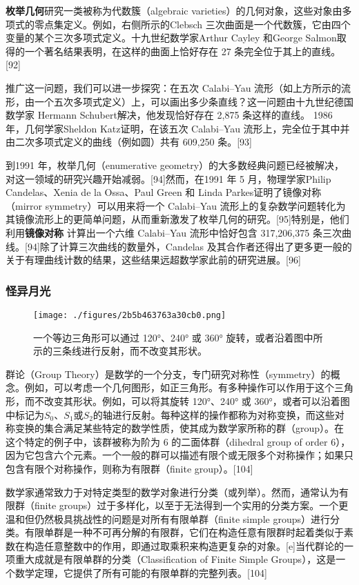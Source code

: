 \textbf{枚举几何}研究一类被称为代数簇（algebraic varieties）的几何对象，这些对象由多项式的零点集定义。例如，右侧所示的Clebsch 三次曲面是一个代数簇，它由四个变量的某个三次多项式定义。十九世纪数学家Arthur Cayley 和George Salmon取得的一个著名结果表明，在这样的曲面上恰好存在 27 条完全位于其上的直线。[92]  

推广这一问题，我们可以进一步探究：在五次 Calabi–Yau 流形（如上方所示的流形，由一个五次多项式定义）上，可以画出多少条直线？这一问题由十九世纪德国数学家 Hermann Schubert解决，他发现恰好存在 2,875 条这样的直线。 1986 年，几何学家Sheldon Katz证明，在该五次 Calabi–Yau 流形上，完全位于其中并由二次多项式定义的曲线（例如圆）共有 609,250 条。[93]

到1991 年，枚举几何（enumerative geometry）的大多数经典问题已经被解决，对这一领域的研究兴趣开始减弱。[94]然而，在1991 年 5 月，物理学家Philip Candelas、Xenia de la Ossa、Paul Green 和 Linda Parkes证明了镜像对称（mirror symmetry）可以用来将一个 Calabi–Yau 流形上的复杂数学问题转化为其镜像流形上的更简单问题，从而重新激发了枚举几何的研究。[95]特别是，他们利用\textbf{镜像对称} 计算出一个六维 Calabi–Yau 流形中恰好包含 317,206,375 条三次曲线。[94]除了计算三次曲线的数量外，Candelas 及其合作者还得出了更多更一般的关于有理曲线计数的结果，这些结果远超数学家此前的研究进展。[96]
\subsubsection{怪异月光}
\begin{figure}[ht]
\centering
\texttt{[image: ./figures/2b5b463763a30cb0.png]}
\caption{一个等边三角形可以通过 120°、240° 或 360° 旋转，或者沿着图中所示的三条线进行反射，而不改变其形状。} \label{fig_String_12}
\end{figure}
群论（Group Theory）是数学的一个分支，专门研究对称性（symmetry）的概念。例如，可以考虑一个几何图形，如正三角形。有多种操作可以作用于这个三角形，而不改变其形状。例如，可以将其旋转 120°、240° 或 360°，或者可以沿着图中标记为\(S_0\)、\(S_1\)或\(S_2\)的轴进行反射。每种这样的操作都称为对称变换，而这些对称变换的集合满足某些特定的数学性质，使其成为数学家所称的群（group）。在这个特定的例子中，该群被称为阶为 6 的二面体群（dihedral group of order 6），因为它包含六个元素。一个一般的群可以描述有限个或无限多个对称操作；如果只包含有限个对称操作，则称为有限群（finite group）。[104]

数学家通常致力于对特定类型的数学对象进行分类（或列举）。然而，通常认为有限群（finite groups）过于多样化，以至于无法得到一个实用的分类方案。一个更温和但仍然极具挑战性的问题是对所有有限单群（finite simple groups）进行分类。有限单群是一种不可再分解的有限群，它们在构造任意有限群时起着类似于素数在构造任意整数中的作用，即通过取乘积来构造更复杂的对象。[e]当代群论的一项重大成就是有限单群的分类（Classification of Finite Simple Groups），这是一个数学定理，它提供了所有可能的有限单群的完整列表。[104]

